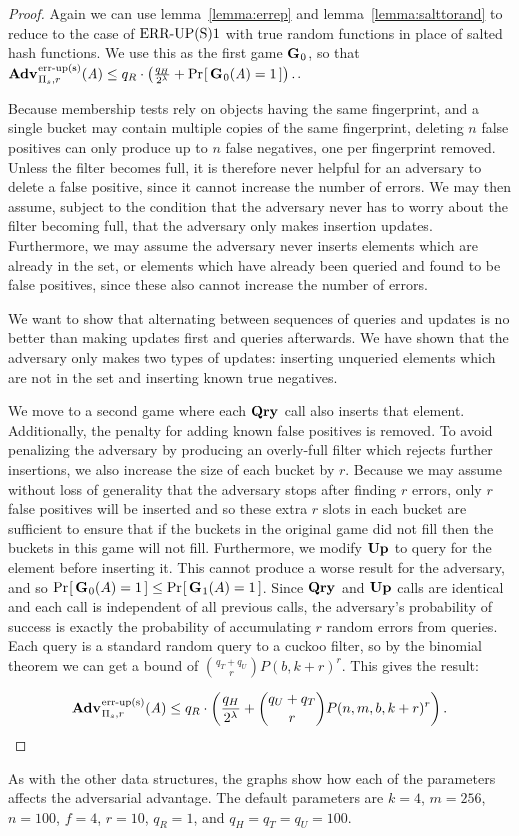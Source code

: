 \begin{proof}
Again we can use lemma~\ref{lemma:errep} and lemma~\ref{lemma:salttorand} to
reduce to the case of $\textnormal{ERR\mbox{-}UP(S)}1$ with true random functions in place of salted
hash functions. We use this as the first game $\mathbf{G}\hspace{0.5pt}_0$, so that
$\Adv{\erreps}_{\struct_s,r}(\advA) \le q_R \cdot \left(\frac{q_H}{2^\lambda} +
\Prob{\game_0(\advA) = 1}\right).$.

Because membership tests rely on objects having the same fingerprint, and a
single bucket may contain multiple copies of the same fingerprint, deleting $n$
false positives can only produce up to $n$ false negatives, one per fingerprint
removed. Unless the filter becomes full, it is therefore never helpful for an
adversary to delete a false positive, since it cannot increase the number of
errors. We may then assume, subject to the condition that the adversary never
has to worry about the filter becoming full, that the adversary only makes
insertion updates. Furthermore, we may assume the adversary never inserts
elements which are already in the set, or elements which have already been
queried and found to be false positives, since these also cannot increase the
number of errors.

We want to show that alternating between sequences of queries and updates is no
better than making updates first and queries afterwards. We have shown that the
adversary only makes two types of updates: inserting unqueried elements which
are not in the set and inserting known true negatives.

We move to a second game where each $\mathbf{Qry}\hspace{0.5pt}$ call also inserts that element.
Additionally, the penalty for adding known false positives is removed. To avoid
penalizing the adversary by producing an overly-full filter which rejects
further insertions, we also increase the size of each bucket by $r$. Because we
may assume without loss of generality that the adversary stops after finding $r$
errors, only $r$ false positives will be inserted and so these extra $r$ slots
in each bucket are sufficient to ensure that if the buckets in the original game
did not fill then the buckets in this game will not fill. Furthermore, we modify
$\mathbf{Up}\hspace{0.5pt}$ to query for the element before inserting it. This cannot produce a worse
result for the adversary, and so $\Pr\hspace{-1pt}\left[\,\mathbf{G}\hspace{0.5pt}_0(A) = 1\,\right] \le \Pr\hspace{-1pt}\left[\,\mathbf{G}\hspace{0.5pt}_1(A) =
1\,\right]$. Since $\mathbf{Qry}\hspace{0.5pt}$ and $\mathbf{Up}\hspace{0.5pt}$ calls are identical and each call is independent
of all previous calls, the adversary's probability of success is exactly the
probability of accumulating $r$ random errors from queries. Each query is a
standard random query to a cuckoo filter, so by the binomial theorem we can get
a bound of $\binom{q_T+q_U}{r}P(b,k+r)^r$. This gives the result:

$$\Adv{\erreps}_{\struct_s,r}(\advA) \le q_R \cdot \left(\frac{q_H}{2^\lambda} +
\binom{q_U+q_T}{r}P(n,m,b,k+r)^r\right).$$

\end{proof}

As with the other data structures, the graphs show how each of the parameters
affects the adversarial advantage. The default parameters are $k = 4$, $m =
256$, $n = 100$, $f = 4$, $r = 10$, $q_R = 1$, and $q_H = q_T = q_U = 100$.

